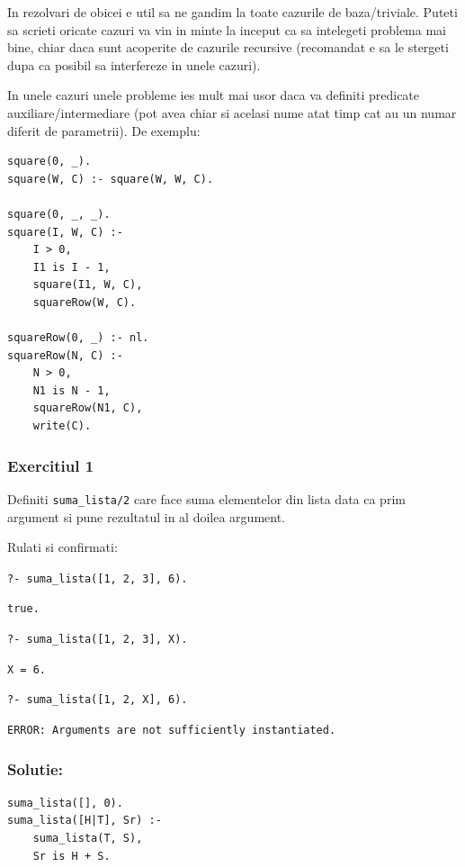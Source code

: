 \begin{note}
	In rezolvari de obicei e util sa ne gandim la toate cazurile de baza/triviale. Puteti sa scrieti oricate cazuri va vin in minte la inceput ca sa intelegeti problema mai bine, chiar daca sunt acoperite de cazurile recursive (recomandat e sa le stergeti dupa ca posibil sa interfereze in unele cazuri).

    In unele cazuri unele probleme ies mult mai usor daca va definiti predicate auxiliare/intermediare (pot avea chiar si acelasi nume atat timp cat au un numar diferit de parametrii). De exemplu:
\end{note}


\newpage


\begin{lstlisting}[caption={Auxiliary predicates example}]
square(0, _).
square(W, C) :- square(W, W, C).

square(0, _, _).
square(I, W, C) :-
    I > 0,
    I1 is I - 1,
    square(I1, W, C),
    squareRow(W, C).

squareRow(0, _) :- nl.
squareRow(N, C) :-
    N > 0,
    N1 is N - 1,
    squareRow(N1, C),
    write(C).
\end{lstlisting}




\subsubsection*{Exercitiul 1}

Definiti \texttt{suma\_lista/2} care face suma elementelor din lista data ca prim argument si pune rezultatul in al doilea argument.

Rulati si confirmati:

\texttt{?- suma\_lista([1, 2, 3], 6).}

\texttt{true.}

\texttt{?- suma\_lista([1, 2, 3], X).}

\texttt{X = 6.}

\texttt{?- suma\_lista([1, 2, X], 6).}

\texttt{ERROR: Arguments are not sufficiently instantiated.}

\subsubsection*{Solutie:}

\begin{lstlisting}
suma_lista([], 0).
suma_lista([H|T], Sr) :-
    suma_lista(T, S),
    Sr is H + S.
\end{lstlisting}



